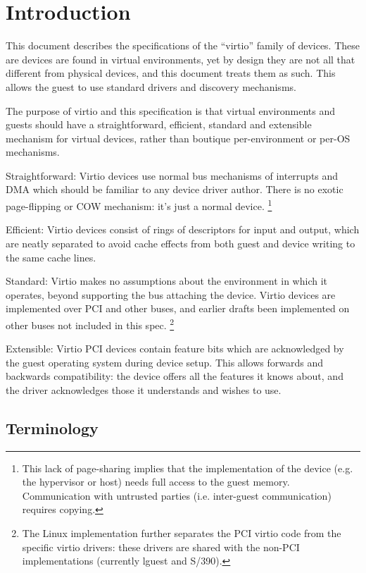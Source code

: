 \chapter{Introduction}

This document describes the specifications of the “virtio” family of
devices. These are devices are found in virtual environments, yet by
design they are not all that different from physical devices, and this
document treats them as such. This allows the guest to use standard
drivers and discovery mechanisms.

The purpose of virtio and this specification is that virtual
environments and guests should have a straightforward, efficient,
standard and extensible mechanism for virtual devices, rather
than boutique per-environment or per-OS mechanisms.

  Straightforward: Virtio devices use normal bus mechanisms of
  interrupts and DMA which should be familiar to any device driver
  author. There is no exotic page-flipping or COW mechanism: it's just
  a normal device.
\footnote{This lack of page-sharing implies that the implementation of the
device (e.g. the hypervisor or host) needs full access to the
guest memory. Communication with untrusted parties (i.e.
inter-guest communication) requires copying.
}

  Efficient: Virtio devices consist of rings of descriptors
  for input and output, which are neatly separated to avoid cache
  effects from both guest and device writing to the same cache
  lines.

  Standard: Virtio makes no assumptions about the environment in which
  it operates, beyond supporting the bus attaching the device.  Virtio
  devices are implemented over PCI and other buses, and earlier drafts
  been implemented on other buses not included in this spec.
\footnote{The Linux implementation further separates the PCI virtio code
from the specific virtio drivers: these drivers are shared with
the non-PCI implementations (currently lguest and S/390).
}

  Extensible: Virtio PCI devices contain feature bits which are
  acknowledged by the guest operating system during device setup.
  This allows forwards and backwards compatibility: the device
  offers all the features it knows about, and the driver
  acknowledges those it understands and wishes to use.

\section{Terminology}\label{Terminology}

